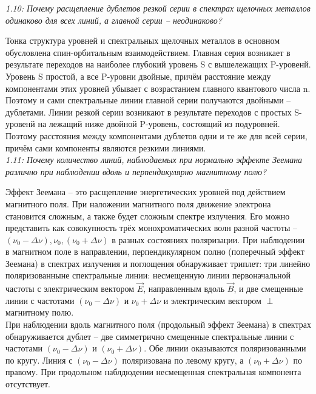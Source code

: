     \emph{1.10: Почему расщепление дублетов резкой серии в спектрах 
    	щелочных металлов одинаково для всех линий, а главной серии -- 
        неодинаково?}
        
        Тонка структура уровней и спектральных щелочных металлов в 
        основном обусловлена спин-орбитальным взаимодействием. Главная 
        серия возникает в результате переходов на наиболее глубокий 
        уровень S с вышележащих P-уровенй. Уровень S простой, а все 
        P-уровни двойные, причём расстояние между компонентами этих 
        уровней убывает с возрастанием главного квантового числа n. 
        Поэтому и сами спектральные линии главной серии получаются 
        двойными -- дублетами. Линии резкой серии возникают в 
        результате переходов с простых S-уровенй на лежащий ниже 
        двойной P-уровень, состоящий из подуровней. Поэтому расстояния 
        между компонентами дублетов одни и те же для всей серии, причём 
        сами компоненты являются резкими линиями.\\

    \emph{1.11: Почему количество линий, наблюдаемых при нормально эффекте 
        Зеемана различно при наблюдении вдоль и перпендикулярно 
        магнитному полю?}

        Эффект Зеемана -- это расщепление энергетических уровней под 
        действием магнитного поля. При наложении магнитного поля 
        движение электрона становится сложным, а также будет сложным 
        спектре излучения. Его можно представить как совокупность трёх 
        монохроматических волн разной частоты -- 
        \( (\nu_0 - \Delta \nu), \nu_0, (\nu_0 + \Delta \nu) \) 
        в разных состояниях поляризации. При наблюдении в магнитном 
        поле в направлении, перпендикулярном полно (поперечный эффект 
        Зеемана) в спектрах излучения и поглощения обнаруживает 
        триплет: три линейно поляризованныне спектральные линии: 
        несмещенную линии первоначальной частоты с электрическим вектором 
        \( \vec{E} \), направленным вдоль \( \vec{B} \), и две 
        смещенные линии с частотами \( (\nu_0 - \Delta \nu) \) и 
        \( \nu_0 + \Delta \nu \) и электрическим вектором \( \perp \) 
        магнитному полю.\\
        
        При наблюдении вдоль магнитного поля (продольный эффект Зеемана) 
        в спектрах обнаруживается дублет -- две симметрично смещенные 
        спектральные линии с частотами 
        \( (\nu_0 - \Delta \nu) \) и \( (\nu_0 + \Delta \nu) \). 
        Обе линии оказываются поляризованными по кругу. Линия с 
        \( (\nu_0 - \Delta \nu) \) поляризована по левому кругу, а
        \( (\nu_0 + \Delta \nu) \) по правому. При продольном наблдюдении 
        несмещенная спектральная компонента отсутствует. 
   
